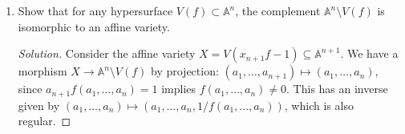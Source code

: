 \documentclass{article}
\theoremstyle{definition}
\DeclareMathOperator{\rad}{rad}
\newcommand{\F}{\mathbb{F}}
\newcommand{\A}{\mathbb{A}}
\newcommand{\R}{\mathbb{R}}
\newcommand{\C}{\mathbb{C}}
\begin{document}
\begin{enumerate}
\begin{enumerate}[label=(\alph*)]
            \item Over $\C$ or $\R$ the ideal $I_{\A^n}$ is zero. What happens
                over $\F_p$?
        \end{enumerate}

        \begin{proof}[Solution]
            \begin{enumerate}[label=(\alph*)]
                \item Let $f$ be a non-constant polynomial with no roots over a
                    non-algebraically closed field, such as $x^2+1$ over $\R$.
                    Then $V(f)=\emptyset$ so $I_{V(f)}=(1)$, but
                    $1\notin\rad(f)$ as $f$ is non-constant.

                \item Over $\F_p$ affine space $\A^n$ has finitely many points,
                    so $I_{\A^n}$ consists of the polynomials vanishing at these
                    points, including for example
                    $\prod_{a_1\in\F_p}(x_1-a_1)=x_1^p-x_1$. We have
                    \begin{align*}
                        I_{\A^n(\F_p)}
                            &= \bigcap_{a_1,\ldots,a_n\in\F_p}
                                (x_1-a_1,\ldots,x_n-a_n) \\
                            &= \bigcap_{a_2,\ldots,a_n\in\F_p}
                                (x_1^p-x_1,x_2-a_2,\ldots,x_n-a_n) \\
                            &= (x_1^p-x_1,\ldots,x_n^p-x_n).
                    \end{align*}
            \end{enumerate}
        \end{proof}

    \item Show that for any hypersurface $V(f)\subset\A^n$, the complement
        $\A^n\setminus V(f)$ is isomorphic to an affine variety.

        \begin{proof}[Solution]
            Consider the affine variety $X=V(x_{n+1}f-1)\subseteq\A^{n+1}$. We
            have a morphism $X\to\A^n\setminus V(f)$ by projection:
            $(a_1,\ldots,a_{n+1})\mapsto(a_1,\ldots,a_n)$, since
            $a_{n+1}f(a_1,\ldots,a_n)=1$ implies $f(a_1,\ldots,a_n)\ne0$. This has
            an inverse given by
            $(a_1,\ldots,a_n)\mapsto(a_1,\ldots,a_n,1/f(a_1,\ldots,a_n))$, which is
            also regular.
        \end{proof}


\end{enumerate}
\end{document}
